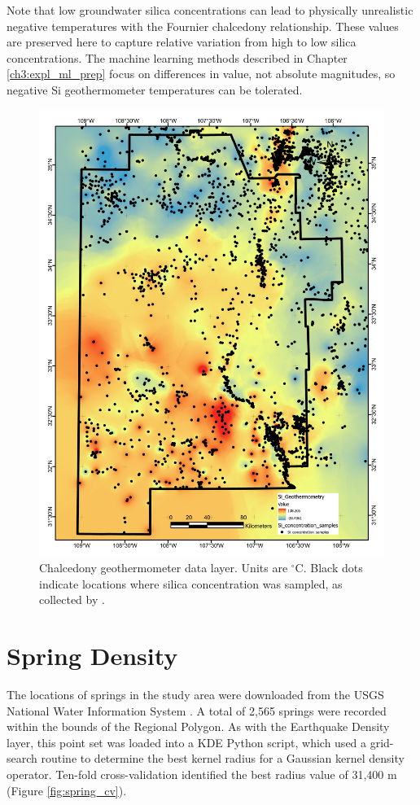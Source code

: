 Note that low groundwater silica concentrations can lead to physically unrealistic negative temperatures with the Fournier chalcedony relationship. These values are preserved here to capture relative variation from high to low silica concentrations. The machine learning methods described in Chapter \ref{ch3:expl_ml_prep} focus on differences in value, not absolute magnitudes, so negative Si geothermometer temperatures can be tolerated.

\begin{figure}[H]
\centering
\includegraphics[width=0.75\linewidth]{templates/images/Figure-SiTemp.pdf}
\caption[Silica geothermometer temperature data layer]{Chalcedony geothermometer data layer. Units are $^\circ$C. Black dots indicate locations where silica concentration was sampled, as collected by \protect\citet{bielicki_hydrogeolgic_2015}.}
\label{fig:feat_si_temp}
\end{figure}

\section{Spring Density}\label{app:dl_spring_density}

The locations of springs in the study area were downloaded from the USGS National Water Information System \citep{usgs_national_2021}. A total of 2,565 springs were recorded within the bounds of the Regional Polygon. As with the Earthquake Density layer, this point set was loaded into a KDE Python script, which used a grid-search routine to determine the best kernel radius for a Gaussian kernel density operator. Ten-fold cross-validation identified the best radius value of 31,400 m (Figure \ref{fig:spring_cv}). 

